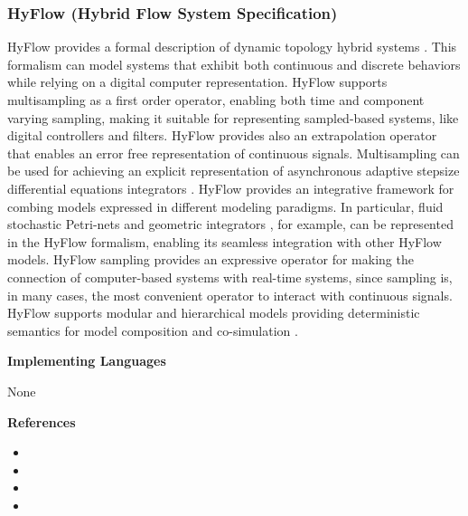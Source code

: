 \subsubsection{HyFlow (Hybrid Flow System Specification)}
\label{subsecF:HyFlow}


HyFlow provides a formal description of dynamic topology hybrid systems \cite{Barros:2003:DSM}. This formalism can model systems that exhibit both continuous and discrete behaviors while relying on a digital computer representation. HyFlow supports multisampling as a first order operator, enabling both time and component varying sampling, making it suitable for representing sampled-based systems, like digital controllers and filters. HyFlow provides also an extrapolation operator that enables an error free representation of continuous signals. Multisampling can be used for achieving an explicit representation of asynchronous adaptive stepsize differential equations integrators \cite{Barros-2018:Geometric}. HyFlow provides an integrative framework for combing models expressed in different modeling paradigms. In particular, fluid stochastic Petri-nets \cite{Barros-2015:FSPN} and geometric integrators \cite{Barros-2018:Geometric}, for example, can be  represented in the HyFlow formalism, enabling its seamless integration with other HyFlow models. HyFlow sampling provides an expressive operator for making the connection of computer-based systems with real-time systems, since sampling is, in many cases, the most convenient operator to interact with continuous signals. HyFlow supports modular and hierarchical models providing deterministic semantics for model composition and co-simulation \cite{Barros:2008:SDS}.

\textbf{Implementing Languages}

None





\textbf{References}
\begin{itemize}
	
\item {}
	
\item {}
	
\item {}
	
\item {}
\end{itemize}

